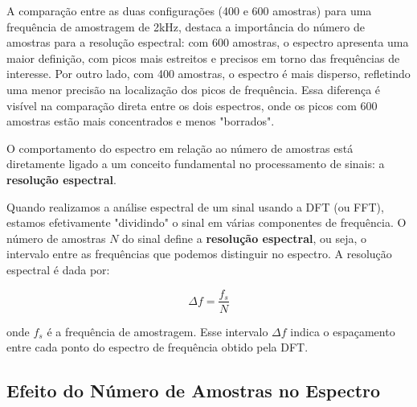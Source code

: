 

A comparação entre as duas configurações (400 e 600 amostras) para uma frequência de amostragem de 2kHz, destaca a importância do número de amostras para a resolução espectral: com 600 amostras, o espectro apresenta uma maior definição, com picos mais estreitos e precisos em torno das frequências de interesse. Por outro lado, com 400 amostras, o espectro é mais disperso, refletindo uma menor precisão na localização dos picos de frequência. Essa diferença é visível na comparação direta entre os dois espectros, onde os picos com 600 amostras estão mais concentrados e menos "borrados".

O comportamento do espectro em relação ao número de amostras está diretamente ligado a um conceito fundamental no processamento de sinais: a \textbf{resolução espectral}.

Quando realizamos a análise espectral de um sinal usando a DFT (ou FFT), estamos efetivamente "dividindo" o sinal em várias componentes de frequência. O número de amostras $N$ do sinal define a \textbf{resolução espectral}, ou seja, o intervalo entre as frequências que podemos distinguir no espectro. A resolução espectral é dada por:

$$
\Delta f = \frac{f_s}{N}
$$

onde $f_s$ é a frequência de amostragem. Esse intervalo $\Delta f$ indica o espaçamento entre cada ponto do espectro de frequência obtido pela DFT.

\subsection*{Efeito do Número de Amostras no Espectro}

